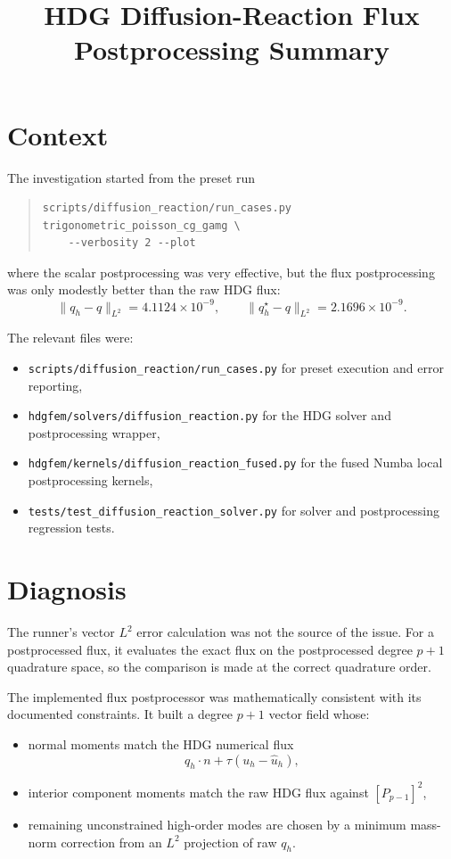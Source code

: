\documentclass[11pt]{article}
\title{HDG Diffusion-Reaction Flux Postprocessing Summary}
\author{}
\date{}
\begin{document}
\maketitle

\section{Context}

The investigation started from the preset run
\begin{quote}
\small
\begin{verbatim}
scripts/diffusion_reaction/run_cases.py trigonometric_poisson_cg_gamg \
    --verbosity 2 --plot
\end{verbatim}
\end{quote}
where the scalar postprocessing was very effective, but the flux postprocessing
was only modestly better than the raw HDG flux:
\[
\|q_h - q\|_{L^2} = 4.1124 \times 10^{-9}, \qquad
\|q_h^\star - q\|_{L^2} = 2.1696 \times 10^{-9}.
\]

The relevant files were:
\begin{itemize}
    \item \verb|scripts/diffusion_reaction/run_cases.py| for preset execution and error reporting,
    \item \verb|hdgfem/solvers/diffusion_reaction.py| for the HDG solver and postprocessing wrapper,
    \item \verb|hdgfem/kernels/diffusion_reaction_fused.py| for the fused Numba local postprocessing kernels,
    \item \verb|tests/test_diffusion_reaction_solver.py| for solver and postprocessing regression tests.
\end{itemize}

\section{Diagnosis}

The runner's vector $L^2$ error calculation was not the source of the issue.
For a postprocessed flux, it evaluates the exact flux on the postprocessed
degree $p+1$ quadrature space, so the comparison is made at the correct
quadrature order.

The implemented flux postprocessor was mathematically consistent with its
documented constraints. It built a degree $p+1$ vector field whose:
\begin{itemize}
    \item normal moments match the HDG numerical flux
    \[
    q_h \cdot n + \tau (u_h - \widehat{u}_h),
    \]
    \item interior component moments match the raw HDG flux against
    $[P_{p-1}]^2$,
    \item remaining unconstrained high-order modes are chosen by a minimum
    mass-norm correction from an $L^2$ projection of raw $q_h$.
\end{itemize}
\end{document}
